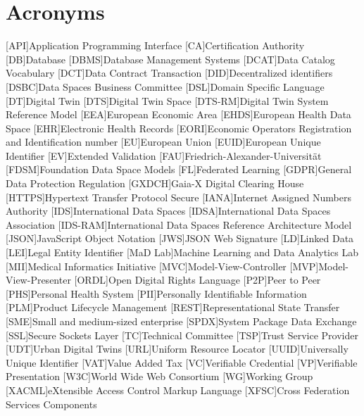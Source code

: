 \chapter{Acronyms}
\begin{acronym}
    [API]{Application Programming Interface}
    [CA]{Certification Authority}
    [DB]{Database}
    [DBMS]{Database Management Systems}
    [DCAT]{Data Catalog Vocabulary}
    [DCT]{Data Contract Transaction}
    [DID]{Decentralized identifiers}
    [DSBC]{Data Spaces Business Committee}
    [DSL]{Domain Specific Language}
    [DT]{Digital Twin}
    [DTS]{Digital Twin Space}
    [DTS-RM]{Digital Twin System Reference Model}
    [EEA]{European Economic Area}
    [EHDS]{European Health Data Space}
    [EHR]{Electronic Health Records}
    [EORI]{Economic Operators Registration and Identification number}
    [EU]{European Union}
    [EUID]{European Unique Identifier}
    [EV]{Extended Validation}
    [FAU]{Friedrich-Alexander-Universität}
    [FDSM]{Foundation Data Space Models}
    [FL]{Federated Learning}
    [GDPR]{General Data Protection Regulation}
    [GXDCH]{Gaia-X Digital Clearing House}
    [HTTPS]{Hypertext Transfer Protocol Secure}
    [IANA]{Internet Assigned Numbers Authority}
    [IDS]{International Data Spaces}
    [IDSA]{International Data Spaces Association}
    [IDS-RAM]{International Data Spaces Reference Architecture Model}
    [JSON]{JavaScript Object Notation}
    [JWS]{JSON Web Signature}
    [LD]{Linked Data}
    [LEI]{Legal Entity Identifier}
    [MaD Lab]{Machine Learning and Data Analytics Lab}
    [MII]{Medical Informatics Initiative}
    [MVC]{Model-View-Controller}
    [MVP]{Model-View-Presenter}
    [ORDL]{Open Digital Rights Language}
    [P2P]{Peer to Peer}
    [PHS]{Personal Health System}
    [PII]{Personally Identifiable Information}
    [PLM]{Product Lifecycle Management}
    [REST]{Representational State Transfer}
    [SME]{Small and medium-sized enterprise}
    [SPDX]{System Package Data Exchange}
    [SSL]{Secure Sockets Layer}
    [TC]{Technical Committee}
    [TSP]{Trust Service Provider}
    [UDT]{Urban Digital Twins}
    [URL]{Uniform Resource Locator}
    [UUID]{Universally Unique Identifier}
    [VAT]{Value Added Tax}
    [VC]{Verifiable Credential}
    [VP]{Verifiable Presentation}
    [W3C]{World Wide Web Consortium}
    [WG]{Working Group}
    [XACML]{eXtensible Access Control Markup Language}
    [XFSC]{Cross Federation Services Components}
\end{acronym}
